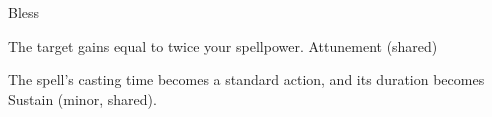 \begin{spellsection}{Bless}
\begin{spellheader}
\end{spellheader}
\begin{spellcontent}
\begin{spelltargetinginfo}
\end{spelltargetinginfo}
\begin{spelleffects}
\spelleffect The target gains  equal to twice your spellpower.
\spelldur Attunement (shared)
\end{spelleffects}
\end{spellcontent}
\begin{spellfooter}
\end{spellfooter}
\begin{spellsubcontent}
\begin{spellcantrip}
The spell's casting time becomes a standard action, and its duration becomes Sustain (minor, shared).
\end{spellcantrip}
\end{spellsubcontent}
\end{spellsection}
